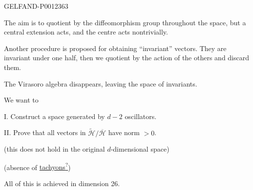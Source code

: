 \begin{GelfandAdjacentEvidence}{GELFAND-P001236}{3}


The aim is to quotient by the diffeomorphism group throughout the space, but a central extension acts, and the centre acts nontrivially.

Another procedure is proposed for obtaining “invariant” vectors. They are invariant under one half, then we quotient by the action of the others and discard them.

The Virasoro algebra disappears, leaving the space of invariants.

We want to

I. Construct a space generated by $d-2$ oscillators.

II. Prove that all vectors in $\widetilde{\mathcal H}/\overline{\mathcal H}$ have norm $>0$.

(this does not hold in the original $d$-dimensional space)

(absence of \underline{tachyons\textsuperscript{?}})
\end{GelfandAdjacentEvidence}


All of this is achieved in dimension 26.


